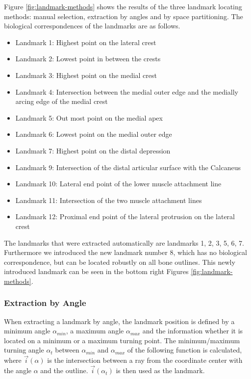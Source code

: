 \documentclass[pdftex,12pt,a4paper]{report}
\begin{document}
Figure \ref{fig:landmark-methods} shows the results of the three landmark locating methods: manual selection, extraction by angles and
by space partitioning. The biological correspondences of the landmarks are as follows.

\begin{itemize}
\item Landmark 1: Highest point on the lateral crest
\item Landmark 2: Lowest point in between the crests
\item Landmark 3: Highest point on the medial crest
\item Landmark 4: Intersection between the medial outer edge and the medially arcing edge of the medial crest
\item Landmark 5: Out most point on the medial apex
\item Landmark 6: Lowest point on the medial outer edge
\item Landmark 7: Highest point on the distal depression
\item Landmark 9: Intersection of the distal articular surface with the Calcaneus
\item Landmark 10: Lateral end point of the lower muscle attachment line
\item Landmark 11: Intersection of the two muscle attachment lines
\item Landmark 12: Proximal end point of the lateral protrusion on the lateral crest
\end{itemize}

The landmarks that were extracted automatically are landmarks 1, 2, 3, 5, 6, 7. Furthermore we introduced the new
landmark number 8, which has no biological correspondence, but can be located robustly on all bone outlines. This newly introduced landmark can be seen in the bottom right Figures \ref{fig:landmark-methods}.

\subsubsection{Extraction by Angle}

When extracting a landmark by angle, the landmark position is defined by a minimum angle $\alpha_{min}$, a maximum
angle $\alpha_{max}$ and the information whether it is located on a minimum or a maximum turning point.
The minimum/maximum turning angle $\alpha_{t}$ between $\alpha_{min}$ and $\alpha_{max}$ of the following function
is calculated, where $\vec{i}(\alpha)$ is the intersection between a ray from the coordinate center with the angle $\alpha$ and
the outline. $\vec{i}(\alpha_t)$ is then used as the landmark.
\end{document}
